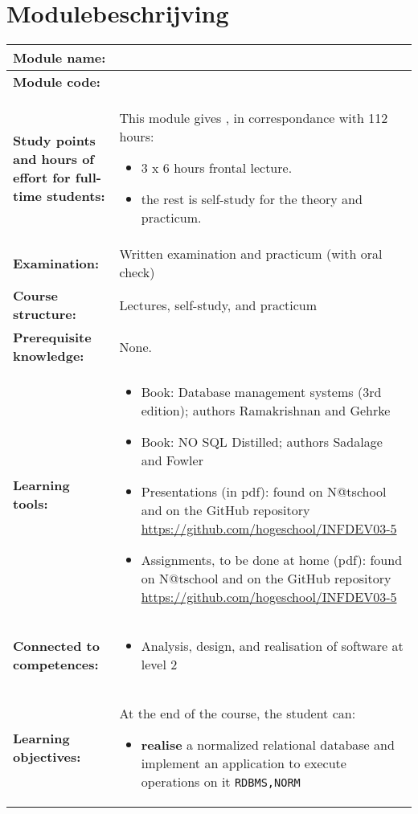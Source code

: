 \section*{Modulebeschrijving}
\begin{tabularx}{\textwidth}{|>{\columncolor{lichtGrijs}} p{}|X|}
	\hline
	\textbf{Module name:} & \modulenaam\\
	\hline
	\textbf{Module code: }& \modulecode\\
	\hline
	\textbf{Study points \newline and hours of effort for full-time students:} & This module gives \stdPunten, in correspondance with 112 hours:
	\begin{itemize}
		\item 3 x 6 hours frontal lecture.
		\item the rest is self-study for the theory and practicum.
	\end{itemize} \\
	\hline
	\textbf{Examination:} & Written examination and practicum (with oral check) \\
	\hline
	\textbf{Course structure:} & Lectures, self-study, and practicum \\
	\hline
	\textbf{Prerequisite knowledge:} & None. \\
	\hline
	\textbf{Learning tools:}  &
		\begin{itemize}
			\item Book: Database management systems (3rd edition); authors Ramakrishnan and Gehrke
			\item Book: NO SQL Distilled; authors Sadalage and Fowler
			\item Presentations (in pdf): found on N@tschool and on the GitHub repository \url{https://github.com/hogeschool/INFDEV03-5}
			\item Assignments, to be done at home (pdf): found on N@tschool and on the GitHub repository \url{https://github.com/hogeschool/INFDEV03-5}
		\end{itemize} \\
	\hline
	\textbf{Connected to \newline competences:} &
		\begin{itemize}
			\item Analysis, design, and realisation of software at level 2
		\end{itemize} \\
	\hline
	\textbf{Learning objectives:} &
		At the end of the course, the student can:
			\begin{itemize}
				\item \textbf{realise} a normalized relational database and implement an application to execute operations on it \texttt{RDBMS,NORM}


\end{itemize}
\end{tabularx}

